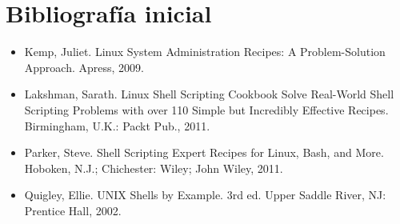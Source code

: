 \section {Bibliografía inicial}
\begin{itemize}
\item Kemp, Juliet. Linux System Administration Recipes: A Problem-Solution Approach. Apress, 2009. 
\item Lakshman, Sarath. Linux Shell Scripting Cookbook Solve Real-World Shell Scripting Problems with over 110 Simple but Incredibly Effective Recipes. Birmingham, U.K.: Packt Pub., 2011. 
\item Parker, Steve. Shell Scripting Expert Recipes for Linux, Bash, and More. Hoboken, N.J.; Chichester: Wiley; John Wiley, 2011.
\item Quigley, Ellie. UNIX Shells by Example. 3rd ed. Upper Saddle River, NJ: Prentice Hall, 2002.
\end{itemize}



